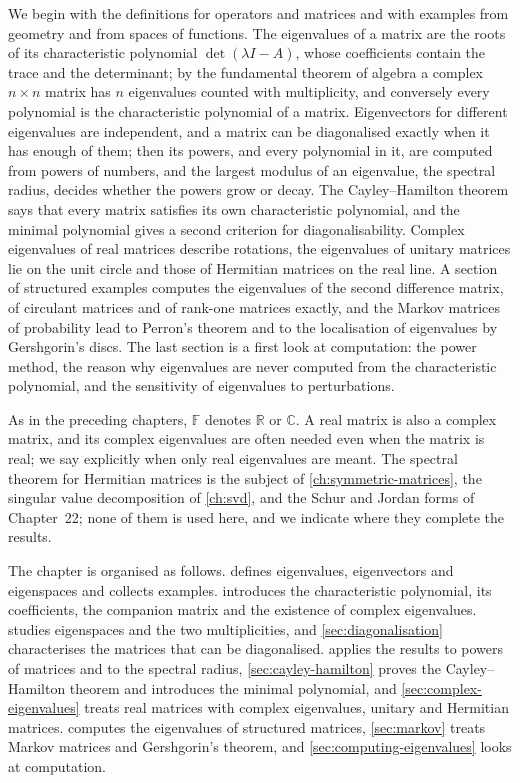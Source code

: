 We begin with the definitions for operators and matrices and with examples from geometry and from spaces of functions. The eigenvalues of a matrix are the roots of its characteristic polynomial $\det(\lambda I-A)$, whose coefficients contain the trace and the determinant; by the fundamental theorem of algebra a complex $n\times n$ matrix has $n$ eigenvalues counted with multiplicity, and conversely every polynomial is the characteristic polynomial of a matrix. Eigenvectors for different eigenvalues are independent, and a matrix can be diagonalised exactly when it has enough of them; then its powers, and every polynomial in it, are computed from powers of numbers, and the largest modulus of an eigenvalue, the spectral radius, decides whether the powers grow or decay. The Cayley--Hamilton theorem says that every matrix satisfies its own characteristic polynomial, and the minimal polynomial gives a second criterion for diagonalisability. Complex eigenvalues of real matrices describe rotations, the eigenvalues of unitary matrices lie on the unit circle and those of Hermitian matrices on the real line. A section of structured examples computes the eigenvalues of the second difference matrix, of circulant matrices and of rank-one matrices exactly, and the Markov matrices of probability lead to Perron's theorem and to the localisation of eigenvalues by Gershgorin's discs. The last section is a first look at computation: the power method, the reason why eigenvalues are never computed from the characteristic polynomial, and the sensitivity of eigenvalues to perturbations.

As in the preceding chapters, $\mathbb F$ denotes $\mathbb R$ or $\mathbb C$. A real matrix is also a complex matrix, and its complex eigenvalues are often needed even when the matrix is real; we say explicitly when only real eigenvalues are meant. The spectral theorem for Hermitian matrices is the subject of \cref{ch:symmetric-matrices}, the singular value decomposition of \cref{ch:svd}, and the Schur and Jordan forms of Chapter~22; none of them is used here, and we indicate where they complete the results.

The chapter is organised as follows.  defines eigenvalues, eigenvectors and eigenspaces and collects examples.  introduces the characteristic polynomial, its coefficients, the companion matrix and the existence of complex eigenvalues.  studies eigenspaces and the two multiplicities, and \cref{sec:diagonalisation} characterises the matrices that can be diagonalised.  applies the results to powers of matrices and to the spectral radius, \cref{sec:cayley-hamilton} proves the Cayley--Hamilton theorem and introduces the minimal polynomial, and \cref{sec:complex-eigenvalues} treats real matrices with complex eigenvalues, unitary and Hermitian matrices.  computes the eigenvalues of structured matrices, \cref{sec:markov} treats Markov matrices and Gershgorin's theorem, and \cref{sec:computing-eigenvalues} looks at computation.

